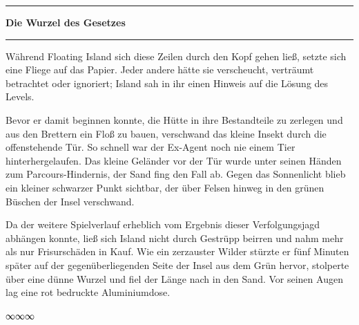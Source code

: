 \noindent \parbox{\textwidth}{ \vspace{3ex} \hrule \vspace{3ex}

\textbf{Die Wurzel des Gesetzes}


\vspace{3ex} \hrule \vspace{3ex} }

Während Floating Island sich diese Zeilen durch den Kopf gehen ließ, setzte sich eine Fliege auf das Papier. Jeder andere hätte sie verscheucht, verträumt betrachtet oder ignoriert; Island sah in ihr einen Hinweis auf die Lösung des Levels.

Bevor er damit beginnen konnte, die Hütte in ihre Bestandteile zu zerlegen und aus den Brettern ein Floß zu bauen, verschwand das kleine Insekt durch die offenstehende Tür. So schnell war der Ex-Agent noch nie einem Tier hinterhergelaufen. Das kleine Geländer vor der Tür wurde unter seinen Händen zum Parcours-Hindernis, der Sand fing den Fall ab. Gegen das Sonnenlicht blieb ein kleiner schwarzer Punkt sichtbar, der über Felsen hinweg in den grünen Büschen der Insel verschwand.

Da der weitere Spielverlauf erheblich vom Ergebnis dieser Verfolgungsjagd abhängen konnte, ließ sich Island nicht durch Gestrüpp beirren und nahm mehr als nur Frisurschäden in Kauf. Wie ein zerzauster Wilder stürzte er fünf Minuten später auf der gegenüberliegenden Seite der Insel aus dem Grün hervor, stolperte über eine dünne Wurzel und fiel der Länge nach in den Sand. Vor seinen Augen lag eine rot bedruckte Aluminiumdose.

\begin{center}
∞∞∞
\end{center}

